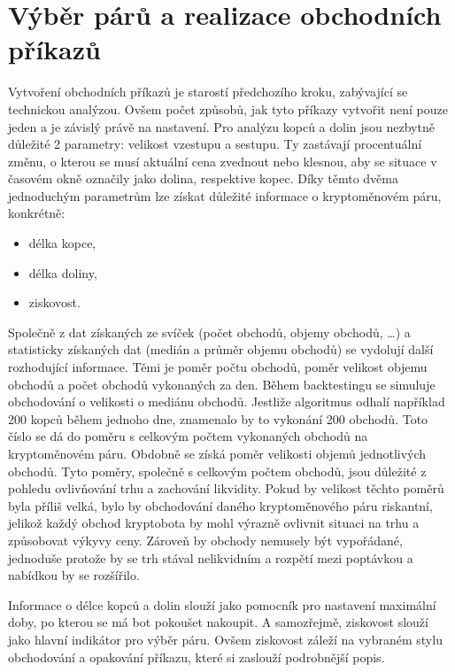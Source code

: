 \section{Výběr párů a realizace obchodních příkazů}
\label{subsec:trade-orders}
Vytvoření obchodních příkazů je starostí předchozího kroku, zabývající se technickou analýzou. Ovšem počet způsobů, jak tyto příkazy vytvořit není pouze jeden a je závislý právě na
nastavení. Pro analýzu kopců a dolin jsou nezbytně důležité 2 parametry: velikost vzestupu a sestupu. Ty zastávají procentuální změnu, o kterou se musí aktuální cena zvednout nebo klesnou,
aby se situace v časovém okně označily jako dolina, respektive kopec. Díky těmto dvěma jednoduchým parametrům lze získat důležité informace o kryptoměnovém páru, konkrétně:
\begin{itemize}
    \item délka kopce,
    \item délka doliny,
    \item ziskovost.
\end{itemize}
Společně z dat získaných ze svíček (počet obchodů, objemy obchodů, \ldots) a statisticky získaných dat (medián a průměr objemu obchodů) se vydolují další rozhodující informace.
Těmi je poměr počtu obchodů, poměr velikost objemu obchodů a počet obchodů vykonaných za den. Během backtestingu se simuluje obchodování o velikosti o mediánu obchodů. Jestliže
algoritmus odhalí například 200 kopců během jednoho dne, znamenalo by to vykonání 200 obchodů. Toto číslo se dá do poměru s celkovým počtem vykonaných obchodů na kryptoměnovém páru.
Obdobně se získá poměr velikosti objemů jednotlivých obchodů. Tyto poměry, společně s celkovým počtem obchodů, jsou důležité z pohledu ovlivňování trhu a zachování likvidity.
Pokud by velikost těchto poměrů byla příliš velká, bylo by obchodování daného kryptoměnového páru riskantní, jelikož každý obchod kryptobota by mohl výrazně ovlivnit situaci na trhu
a způsobovat výkyvy ceny. Zároveň by obchody nemusely být vypořádané, jednoduše protože by se trh stával nelikvidním a rozpětí mezi poptávkou a nabídkou by se rozšířilo.

Informace o délce kopců a dolin slouží jako pomocník pro nastavení maximální doby, po kterou se má bot pokoušet nakoupit. A samozřejmě, ziskovost slouží jako hlavní indikátor
pro výběr páru. Ovšem ziskovost záleží na vybraném stylu obchodování a opakování příkazu, které si zaslouží podrobnější popis.

